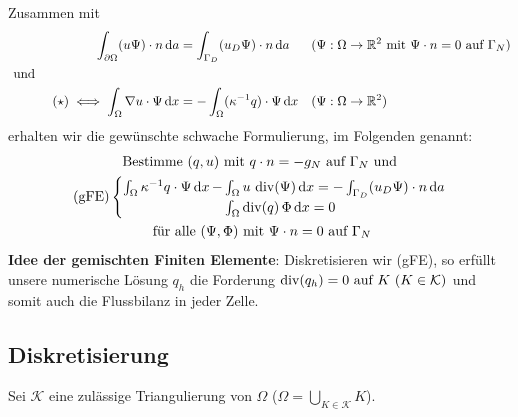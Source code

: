 Zusammen mit 
\begin{align*}
	&&\int_{\partial\Omega} (u\Psi) \cdot n \mathop{}\!\mathrm{d} a &= \int_{\Gamma_D} (u_D\Psi) \cdot n \mathop{}\!\mathrm{d} a &&(\Psi:\Omega \to \mathbb{R}^2 \text{ mit } \Psi \cdot n = 0 \text{ auf } \Gamma_N ) \\
	&\text{ und }\\
	&&(\star) \iff \int_{\Omega} \nabla u \cdot \Psi \mathop{}\!\mathrm{d} x &= - \int_{\Omega} (\kappa^{-1} q) \cdot \Psi \mathop{}\!\mathrm{d} x &&(\Psi:\Omega \to \mathbb{R}^2) 
\end{align*}
erhalten wir die gewünschte schwache Formulierung, im Folgenden  genannt:
\begin{gather*}
	\text{Bestimme } (q,u) \text{ mit } q\cdot n = -g_N \text{ auf } \Gamma_N \text{ und}\\
	\text{(gFE)}\begin{cases}
		\int_{\Omega} \kappa^{-1} q \cdot \Psi \mathop{}\!\mathrm{d} x \, - \mkern-15mu &\int_{\Omega} u \, \operatorname{div}(\Psi) \mathop{}\!\mathrm{d} x = - \int_{\Gamma_D} (u_D \Psi) \cdot n \mathop{}\!\mathrm{d} a\\
		&\int_{\Omega} \operatorname{div}(q) \, \Phi \mathop{}\!\mathrm{d} x = 0
	\end{cases}	\\
	\text{ für alle } (\Psi, \Phi) \text{ mit } \Psi \cdot n = 0 \text{ auf } \Gamma_N 
\end{gather*}
\textbf{Idee der gemischten Finiten Elemente}: Diskretisieren wir (gFE), so erfüllt unsere numerische Lösung $ q_h $ die Forderung $ \dive(q_h) = 0 \text{ auf } K \ (K \in \mathcal{K}) $ und somit auch die Flussbilanz in jeder Zelle.

\subsection{Diskretisierung}

Sei $ \mathcal{K} $ eine zulässige Triangulierung von $ \Omega $ ($ \Omega = \bigcup_{K \in \mathcal{K}} K $).


